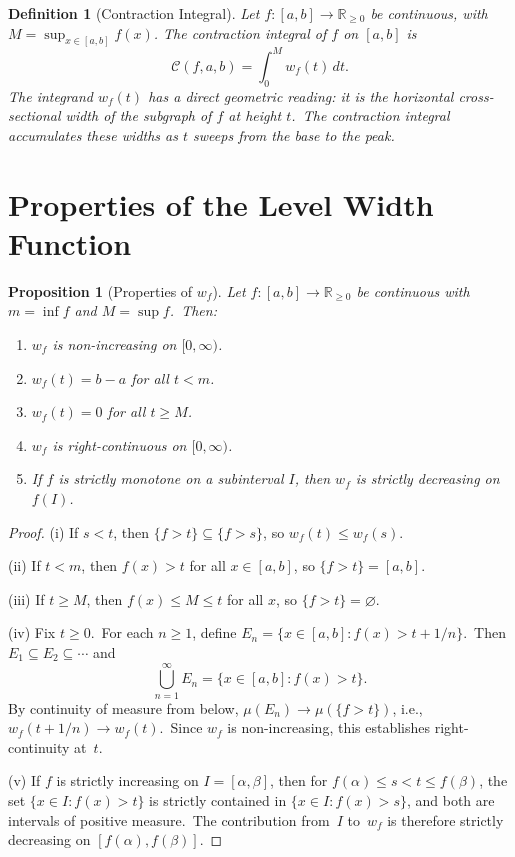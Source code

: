 \documentclass[11pt,a4paper]{article}
\newtheorem{proposition}[theorem]{Proposition}
\newtheorem{definition}[theorem]{Definition}
\begin{document}
\begin{definition}[Contraction Integral]\label{def:contraction}
Let $f:[a,b]\to\mathbb{R}_{\geq 0}$ be continuous, with $M=\sup_{x\in[a,b]}f(x)$.
The \emph{contraction integral} of $f$ on $[a,b]$ is
\[
\mathcal{C}(f,a,b) = \int_0^M w_f(t)\,dt.
\]
The integrand $w_f(t)$ has a direct geometric reading: it is the horizontal cross-sectional width
of the subgraph of $f$ at height $t$.\ The contraction integral accumulates these widths as $t$ sweeps
from the base to the peak.
\end{definition}

\section{Properties of the Level Width Function}

\begin{proposition}[Properties of $w_f$]\label{prop:wf}
Let $f:[a,b]\to\mathbb{R}_{\geq 0}$ be continuous with $m=\inf f$ and $M=\sup f$.\ Then:
\begin{enumerate}[label=(\roman*)]
\item $w_f$ is non-increasing on $[0,\infty)$.
\item $w_f(t) = b-a$ for all $t<m$.
\item $w_f(t) = 0$ for all $t\geq M$.
\item $w_f$ is right-continuous on $[0,\infty)$.
\item If $f$ is strictly monotone on a subinterval $I$, then $w_f$ is strictly decreasing on $f(I)$.
\end{enumerate}
\end{proposition}

\begin{proof}
(i) If $s<t$, then $\{f>t\}\subseteq\{f>s\}$, so $w_f(t)\leq w_f(s)$.

(ii) If $t<m$, then $f(x)>t$ for all $x\in[a,b]$, so $\{f>t\}=[a,b]$.

(iii) If $t\geq M$, then $f(x)\leq M\leq t$ for all $x$, so $\{f>t\}=\varnothing$.

(iv) Fix $t\geq 0$.\ For each $n\geq 1$, define $E_n=\{x\in[a,b]:f(x)>t+1/n\}$.\ Then $E_1\subseteq E_2\subseteq\cdots$ and
\[
\bigcup_{n=1}^{\infty}E_n = \{x\in[a,b]:f(x)>t\}.
\]
By continuity of measure from below, $\mu(E_n)\to\mu(\{f>t\})$, i.e., $w_f(t+1/n)\to w_f(t)$.\ Since $w_f$ is non-increasing, this establishes right-continuity at~$t$.

(v) If $f$ is strictly increasing on $I=[\alpha,\beta]$, then for $f(\alpha)\leq s<t\leq f(\beta)$, the set $\{x\in I:f(x)>t\}$ is strictly contained in $\{x\in I:f(x)>s\}$, and both are intervals of positive measure.\ The contribution from~$I$ to~$w_f$ is therefore strictly decreasing on $[f(\alpha),f(\beta)]$.
\end{proof}
\end{document}
